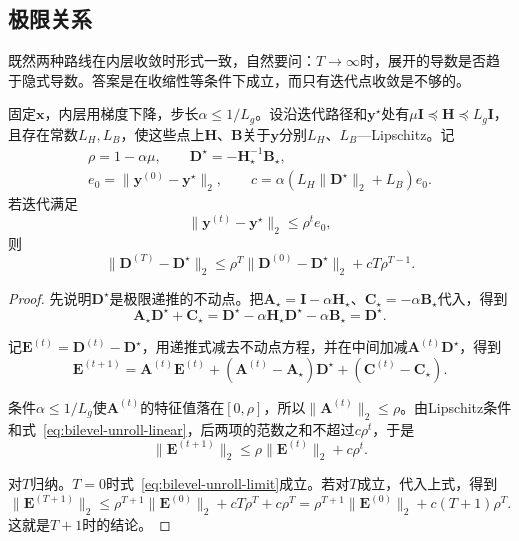 \subsection{极限关系}
\label{sec:bilevel-limit}

既然两种路线在内层收敛时形式一致，自然要问：$T\to\infty$时，展开的导数是否趋于隐式导数。答案是在收缩性等条件下成立，而只有迭代点收敛是不够的。

\begin{theorem}[展开导数的收敛]
\label{thm:bilevel-unroll-limit}
固定$\bm{x}$，内层用梯度下降，步长$\alpha\leq1/L_g$。设沿迭代路径和$\bm{y}^\star$处有$\mu\bm{I}\preceq\bm{H}\preceq L_g\bm{I}$，且存在常数$L_H,L_B$，使这些点上$\bm{H}$、$\bm{B}$关于$\bm{y}$分别$L_H$、$L_B$—Lipschitz。记
\begin{equation}
 \begin{gathered}
 \rho=1-\alpha\mu,\qquad\bm{D}^\star=-\bm{H}_\star^{-1}\bm{B}_\star,\\
 e_0=\lVert\bm{y}^{(0)}-\bm{y}^\star\rVert_2,\qquad c=\alpha(L_H\lVert\bm{D}^\star\rVert_2+L_B)e_0.
 \end{gathered}
 \label{eq:bilevel-unroll-constants}
\end{equation}
若迭代满足
\begin{equation}
 \lVert\bm{y}^{(t)}-\bm{y}^\star\rVert_2\leq\rho^te_0,
 \label{eq:bilevel-unroll-linear}
\end{equation}
则
\begin{equation}
 \lVert\bm{D}^{(T)}-\bm{D}^\star\rVert_2\leq\rho^T\lVert\bm{D}^{(0)}-\bm{D}^\star\rVert_2+cT\rho^{T-1}.
 \label{eq:bilevel-unroll-limit}
\end{equation}
\end{theorem}

\begin{proof}
先说明$\bm{D}^\star$是极限递推的不动点。把$\bm{A}_\star=\bm{I}-\alpha\bm{H}_\star$、$\bm{C}_\star=-\alpha\bm{B}_\star$代入，得到
\[
 \bm{A}_\star\bm{D}^\star+\bm{C}_\star=\bm{D}^\star-\alpha\bm{H}_\star\bm{D}^\star-\alpha\bm{B}_\star=\bm{D}^\star.
\]

记$\bm{E}^{(t)}=\bm{D}^{(t)}-\bm{D}^\star$，用递推式减去不动点方程，并在中间加减$\bm{A}^{(t)}\bm{D}^\star$，得到
\[
 \bm{E}^{(t+1)}=\bm{A}^{(t)}\bm{E}^{(t)}+(\bm{A}^{(t)}-\bm{A}_\star)\bm{D}^\star+(\bm{C}^{(t)}-\bm{C}_\star).
\]

条件$\alpha\leq1/L_g$使$\bm{A}^{(t)}$的特征值落在$[0,\rho]$，所以$\lVert\bm{A}^{(t)}\rVert_2\leq\rho$。由Lipschitz条件和式~\eqref{eq:bilevel-unroll-linear}，后两项的范数之和不超过$c\rho^t$，于是
\[
 \lVert\bm{E}^{(t+1)}\rVert_2\leq\rho\lVert\bm{E}^{(t)}\rVert_2+c\rho^t.
\]

对$T$归纳。$T=0$时式~\eqref{eq:bilevel-unroll-limit}成立。若对$T$成立，代入上式，得到
\[
 \lVert\bm{E}^{(T+1)}\rVert_2\leq\rho^{T+1}\lVert\bm{E}^{(0)}\rVert_2+cT\rho^{T}+c\rho^T=\rho^{T+1}\lVert\bm{E}^{(0)}\rVert_2+c(T+1)\rho^{T}.
\]
这就是$T+1$时的结论。
\end{proof}

